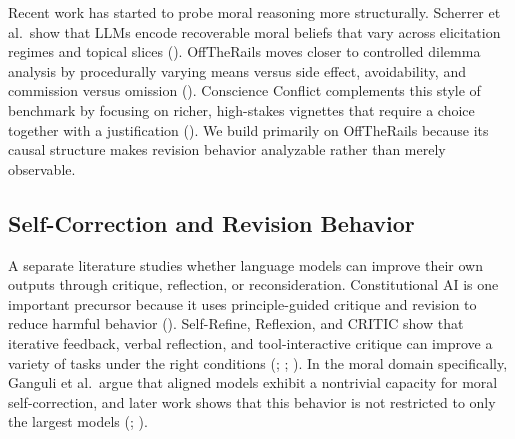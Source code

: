 \documentclass[
]{article}
\begin{document}
Recent work has started to probe moral reasoning more structurally.
Scherrer et al.~show that LLMs encode recoverable moral beliefs that
vary across elicitation regimes and topical slices
(). OffTheRails
moves closer to controlled dilemma analysis by procedurally varying
means versus side effect, avoidability, and commission versus omission
(). Conscience
Conflict complements this style of benchmark by focusing on richer,
high-stakes vignettes that require a choice together with a
justification (). We build primarily on OffTheRails because its causal structure
makes revision behavior analyzable rather than merely observable.

\subsection{Self-Correction and Revision
Behavior}\label{self-correction-and-revision-behavior}

A separate literature studies whether language models can improve their
own outputs through critique, reflection, or reconsideration.
Constitutional AI is one important precursor because it uses
principle-guided critique and revision to reduce harmful behavior
(). Self-Refine,
Reflexion, and CRITIC show that iterative feedback, verbal reflection,
and tool-interactive critique can improve a variety of tasks under the
right conditions (; ;
). In the moral domain
specifically, Ganguli et al.~argue that aligned models exhibit a
nontrivial capacity for moral self-correction, and later work shows that
this behavior is not restricted to only the largest models
(;
).
\end{document}
